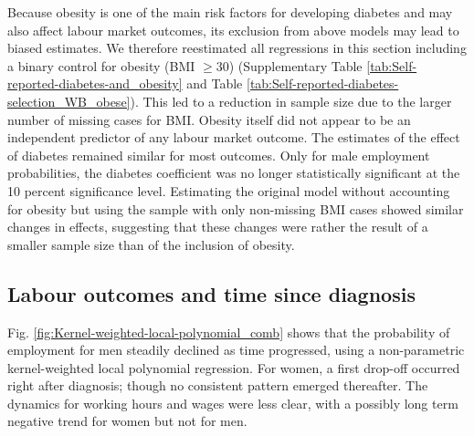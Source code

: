 \documentclass[12pt,english]{article}
\begin{document}
Because obesity is one of the main risk factors for developing diabetes and may also affect labour market outcomes, its exclusion from above models may lead to biased estimates. We therefore reestimated all regressions in this section including a binary control for obesity (BMI $\geq 30$) (Supplementary Table \ref{tab:Self-reported-diabetes-and_obesity} and Table \ref{tab:Self-reported-diabetes-selection_WB_obese}). This led to a reduction in sample size due to the larger number of missing cases for BMI. Obesity itself did not appear to be an independent predictor of any labour market outcome. The estimates of the effect of diabetes remained similar for most outcomes. Only for male employment probabilities, the diabetes coefficient was no longer statistically significant at the 10 percent significance level. Estimating the original model without accounting for obesity but using the sample with only non-missing BMI cases showed similar changes in effects, suggesting that these changes were rather the result of a smaller sample size than of the inclusion of obesity.


\subsection{\label{sec:duration}Labour outcomes and time since diagnosis }

Fig. \ref{fig:Kernel-weighted-local-polynomial_comb} shows that the probability of employment for men steadily declined as time progressed, using a non-parametric kernel-weighted local polynomial regression. For women, a first drop-off occurred right after diagnosis; though no consistent pattern emerged thereafter. The dynamics for working hours and wages were less clear, with a possibly long term negative trend for women but not for men.
\end{document}
